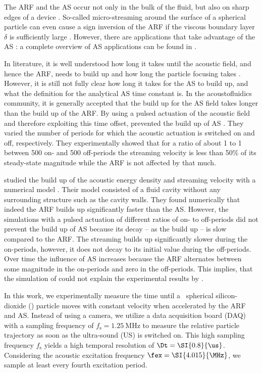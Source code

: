 The ARF and the AS occur not only in the bulk of the fluid, but also on sharp 
edges of a device \cite{Doinikov2020a,Doinikov2020b,Leibacher2015,Nama2016}. 
So-called micro-streaming around the surface of a spherical particle can even 
cause a sign inversion of the ARF if the viscous boundary layer $\delta$ is 
sufficiently large \cite{Baasch2019}. However, there are applications that take 
advantage of the AS \cite{Antfolk2014,Mao2017,Hao2020}: a complete overview of 
AS applications can be found in \cite{Wiklund2012a}.

In literature, it is well understood how long it takes until the acoustic 
field, and hence the ARF, needs to build up \cite{Muller2015} and how long the 
particle focusing takes \cite{Bruus2012-10}. However, it is still not fully 
clear how long it takes for the AS to build up, and what the definition for the 
analytical AS time constant is. In the acoustofluidics community, it is 
generally accepted that the build up for the AS field takes longer than the 
build up of the ARF. By using a pulsed actuation of the acoustic field and 
therefore exploiting this time offset, \citeauthor{Hoyos2013} prevented the 
build up of AS \cite{Hoyos2013,Castro2016}. They varied the number of periods 
for which the acoustic actuation is switched on and off, respectively. They 
experimentally showed that for a ratio of about 1 to 1 between 500 on- and 500 
off-periods the streaming velocity is less than 50\% of its steady-state 
magnitude while the ARF is not affected by that much.

\citeauthor{Muller2015} studied the build up of the acoustic energy density and 
streaming velocity with a numerical model \cite{Muller2015}. Their model 
consisted of a fluid cavity without any surrounding structure such as the 
cavity walls. They found numerically that indeed the ARF builds up 
significantly faster than the AS. However, the simulations with a pulsed 
actuation of different ratios of on- to off-periods did not prevent the build 
up of AS because its decay -- as the build up -- is slow compared to the ARF. 
The streaming builds up significantly slower during the on-periods, however, it 
does not decay to its initial value during the off-periods. Over time the 
influence of AS increases because the ARF alternates between some magnitude in 
the on-periods and zero in the off-periods. This implies, that the simulation 
of \citeauthor{Muller2015} could not explain the experimental results by 
\citeauthor{Hoyos2013}.

In this work, we experimentally measure the time until a \Dtwo~spherical 
silicon-dioxide (\SiO) particle moves with constant velocity when accelerated 
by the ARF and AS. Instead of using a camera, we utilize a data acquisition 
board (DAQ) with a sampling frequency of $f_{\text{s}} = \SI{1.25}{\MHz}$ to 
measure the relative particle trajectory as soon as the ultra-sound (US) is 
switched on. This high sampling frequency $f_{\text{s}}$ yields a high 
temporal resolution of $ \Dt = \SI{0.8}{\us}$. Considering the acoustic 
excitation frequency $\fex = \SI{4.015}{\MHz}$, we sample at least every fourth 
excitation period.

